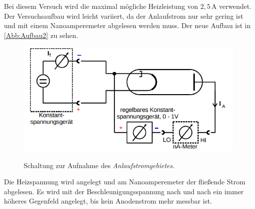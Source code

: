 Bei diesem Versuch wird die maximal mögliche Heizleistung
von $2,5 \, \si{\ampere}$ verwendet. Der Versuchsaufbau 
wird leicht variiert, da der Anlaufstrom nur sehr gering
ist und mit einem Nanoamperemeter abgelesen werden muss.
Der neue Aufbau ist in \autoref{Abb:Aufbau2} zu sehen.
\begin{figure}[H]
    \centering
    \caption{Schaltung zur Aufnahme des \textit{Anlaufstromgebietes}.\cite{sample}}
    \includegraphics[width=\textwidth]{Bilder/Aufbau2.png}
    \label{Abb:Aufbau2}
\end{figure}
Die Heizspannung wird angelegt und am Nanoamperemeter der fließende
Strom abgelesen.
Es wird mit der Beschleunigungsspannung nach und nach ein
immer höheres Gegenfeld angelegt, bis kein Anodenstrom mehr
messbar ist.